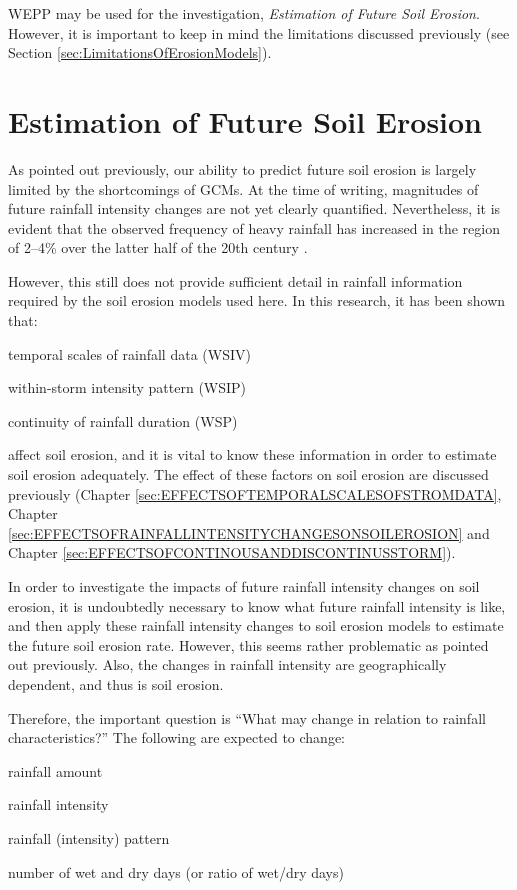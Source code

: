 WEPP may be used for the investigation, \textit{Estimation of Future Soil
Erosion}. However, it is important to keep in mind the limitations discussed
previously (see Section \ref{sec:LimitationsOfErosionModels}).


\section{Estimation of Future Soil Erosion}
\label{sec:MethodsEstimatedFutureSoilErosion}

As pointed out previously, our ability to predict future soil erosion is largely
limited by the shortcomings of GCMs. At the time of writing, magnitudes of
future rainfall intensity changes are not yet clearly quantified. Nevertheless,
it is evident that the observed frequency of heavy rainfall has increased in the
region of 2--4\% over the latter half of the 20th century
\citep{ipcc2001-881}.

However, this still does not provide sufficient detail in rainfall information
required by the soil erosion models used here. In this research, it has been
shown that:
\begin{itemize*}
\item temporal scales of rainfall data (WSIV)
\item within-storm intensity pattern (WSIP)
\item continuity of rainfall duration (WSP)
\end{itemize*}
affect soil erosion, and it is vital to know these information in order to
estimate soil erosion adequately. The effect of these factors on soil erosion
are discussed previously (Chapter \ref{sec:EFFECTSOFTEMPORALSCALESOFSTROMDATA},
Chapter \ref{sec:EFFECTSOFRAINFALLINTENSITYCHANGESONSOILEROSION} and Chapter
\ref{sec:EFFECTSOFCONTINOUSANDDISCONTINUSSTORM}).

In order to investigate the impacts of future rainfall intensity changes on soil
erosion, it is undoubtedly necessary to know what future rainfall intensity is
like, and then apply these rainfall intensity changes to soil erosion models to
estimate the future soil erosion rate. However, this seems rather problematic as
pointed out previously. Also, the changes in rainfall intensity are
geographically dependent, and thus is soil erosion.

Therefore, the important question is ``What may change in relation to rainfall
characteristics?'' The following are expected to change:
\begin{itemize*}
  \item rainfall amount
  \item rainfall intensity
  \item rainfall (intensity) pattern
  \item number of wet and dry days (or ratio of wet/dry days)
\end{itemize*}


